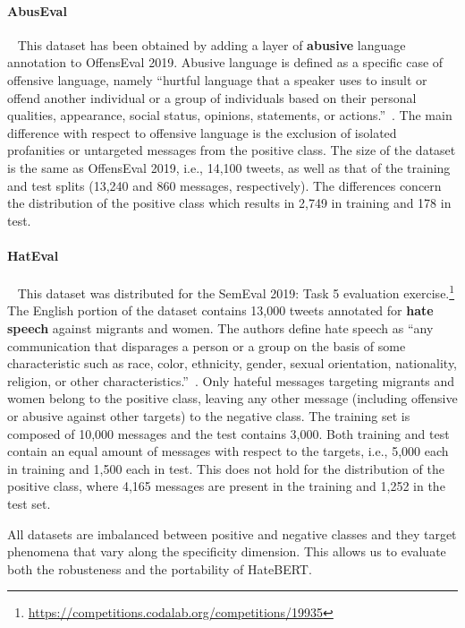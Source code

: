 \documentclass[11pt]{article}
\begin{document}
\paragraph{AbusEval}~\cite{caselli-EtAl:2020:LREC} This dataset has been obtained by adding a layer of \textbf{abusive} language annotation to OffensEval 2019. Abusive language is defined as a specific case of offensive language, namely ``hurtful language that a speaker uses to insult or offend another individual or a group of individuals based on their personal qualities, appearance, social status, opinions, statements, or actions.''~\cite[pg. 6197]{caselli-EtAl:2020:LREC}. The main difference with respect to offensive language is the exclusion of isolated profanities or untargeted messages from the positive class. The size of the dataset is the same as OffensEval 2019, i.e., 14,100 tweets, as well as that of the training and test splits (13,240 and 860 messages, respectively). The differences concern the distribution of the positive class which results in 2,749 in training and 178 in test.

\paragraph{HatEval}~\cite{basile-etal-2019-semeval} This dataset was distributed for the SemEval 2019: Task 5 evaluation exercise.\footnote{\url{https://competitions.codalab.org/competitions/19935}} The English portion of the dataset contains 13,000 tweets annotated for \textbf{hate speech} against migrants and women. The authors define hate speech as ``any communication that disparages a person or a group on the basis of some characteristic such as race, color, ethnicity, gender, sexual orientation, nationality, religion, or other characteristics.''~\cite[pg. 54]{basile-etal-2019-semeval}. Only hateful messages targeting migrants and women belong to the positive class, leaving any other message (including offensive or abusive against other targets) to the negative class. The training set is composed of 10,000 messages and the test contains 3,000. Both training and test contain an equal amount of messages with respect to the targets, i.e., 5,000 each in training and 1,500 each in test. This does not hold for the distribution of the positive class, where 4,165 messages are present in the training and 1,252 in the test set.
\vspace{1em}

\noindent
All datasets are imbalanced between positive and negative classes and they target phenomena that vary along the specificity dimension. This allows us to evaluate both the robusteness and the portability of HateBERT.
\end{document}
